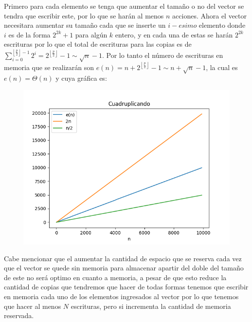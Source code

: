 \documentclass[letterpaper]{article}
\theoremstyle{definition}
\theoremstyle{lemathm}
\theoremstyle{lemathm}
\theoremstyle{lemathm}
\theoremstyle{lemademthm}
\newcommand{\pars}[1]{\left( #1 \right) }
\newcommand{\floor}[1]{\left \lfloor #1 \right\rfloor }
\newcommand{\1}{\mathbbm{1}}
\begin{document}
\begin{enumerate}[label=\textbf{Problema \arabic*}]
\begin{enumerate}
			Primero para cada elemento se tenga que aumentar el tamaño o no del vector se tendra que escribir este, por lo que se harán al menos $n$ acciones. Ahora el vector necesitara aumentar su tamaño cada que se inserte un $i-esimo$ elemento donde $i$ es de la forma $2^{2k} + 1$ para algún $k$ entero, y en cada una de estas se harán $2^{2k}$ escrituras por lo que el total de escrituras para las copias es de $\sum_{i=0}^{\floor{\frac{p}{2}}-1} 2^i = 2^{\floor{\frac{p}{2}}}-1 \sim \sqrt{n}-1$. Por lo tanto el número de escrituras en memoria que se realizarán son $e\pars{n} = n + 2^{\floor{\frac{p}{2}}} - 1 \sim n+\sqrt{n}-1$, la cual es $e\pars{n} = \Theta(n)$ y cuya gráfica es:

			\begin{figure}[H]
				\begin{center}
					\includegraphics[scale=0.80]{Images/Cuadruplicando.png}
				\end{center}
			\end{figure}

        \end{enumerate}

		Cabe mencionar que el aumentar la cantidad de espacio que se reserva cada vez que el vector se quede sin memoria para almacenar apartir del doble del tamaño de este no será optimo en cuanto a memoria, a pesar de que esto reduce la cantidad de copias que tendremos que hacer de todas formas tenemos que escribir en memoria cada uno de los elementos ingresados al vector por lo que tenemos que hacer al menos $N$ escrituras, pero si incrementa la cantidad de memoria reservada.


\end{enumerate}
\end{document}
